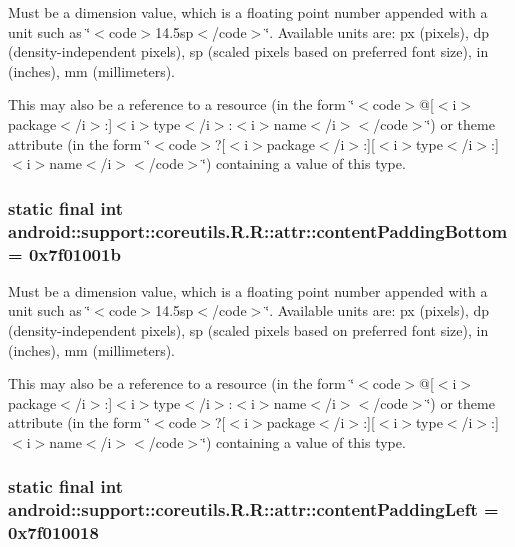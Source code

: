 Must be a dimension value, which is a floating point number appended with a unit such as \char`\"{}$<$code$>$14.5sp$<$/code$>$\char`\"{}. Available units are: px (pixels), dp (density-independent pixels), sp (scaled pixels based on preferred font size), in (inches), mm (millimeters). 

This may also be a reference to a resource (in the form \char`\"{}$<$code$>$@\mbox{[}$<$i$>$package$<$/i$>$:\mbox{]}$<$i$>$type$<$/i$>$:$<$i$>$name$<$/i$>$$<$/code$>$\char`\"{}) or theme attribute (in the form \char`\"{}$<$code$>$?\mbox{[}$<$i$>$package$<$/i$>$:\mbox{]}\mbox{[}$<$i$>$type$<$/i$>$:\mbox{]}$<$i$>$name$<$/i$>$$<$/code$>$\char`\"{}) containing a value of this type. \hypertarget{classandroid_1_1support_1_1coreutils_1_1_r_1_1attr_243856cff973b6d0479e11a8922b2530}{
\subsubsection[{contentPaddingBottom}]{\setlength{\rightskip}{0pt plus 5cm}static final int android::support::coreutils.R.R::attr::contentPaddingBottom = 0x7f01001b}}
\label{classandroid_1_1support_1_1coreutils_1_1_r_1_1attr_243856cff973b6d0479e11a8922b2530}


Must be a dimension value, which is a floating point number appended with a unit such as \char`\"{}$<$code$>$14.5sp$<$/code$>$\char`\"{}. Available units are: px (pixels), dp (density-independent pixels), sp (scaled pixels based on preferred font size), in (inches), mm (millimeters). 

This may also be a reference to a resource (in the form \char`\"{}$<$code$>$@\mbox{[}$<$i$>$package$<$/i$>$:\mbox{]}$<$i$>$type$<$/i$>$:$<$i$>$name$<$/i$>$$<$/code$>$\char`\"{}) or theme attribute (in the form \char`\"{}$<$code$>$?\mbox{[}$<$i$>$package$<$/i$>$:\mbox{]}\mbox{[}$<$i$>$type$<$/i$>$:\mbox{]}$<$i$>$name$<$/i$>$$<$/code$>$\char`\"{}) containing a value of this type. \hypertarget{classandroid_1_1support_1_1coreutils_1_1_r_1_1attr_01ff5499940d5915c78d91d609cb7f42}{
\subsubsection[{contentPaddingLeft}]{\setlength{\rightskip}{0pt plus 5cm}static final int android::support::coreutils.R.R::attr::contentPaddingLeft = 0x7f010018}}
\label{classandroid_1_1support_1_1coreutils_1_1_r_1_1attr_01ff5499940d5915c78d91d609cb7f42}


